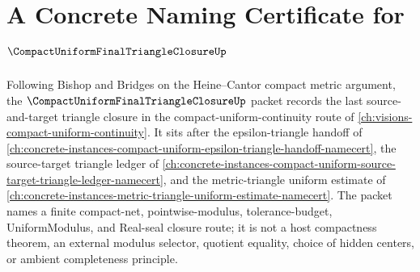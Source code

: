 \chapter{A Concrete Naming Certificate for $\CompactUniformFinalTriangleClosureUp$}
\label{ch:concrete-instances-compact-uniform-final-triangle-closure-namecert}

Following Bishop and Bridges on the Heine--Cantor compact metric argument, the $\CompactUniformFinalTriangleClosureUp$ packet records the last source-and-target triangle closure in the compact-uniform-continuity route of \autoref{ch:visions-compact-uniform-continuity}. It sits after the epsilon-triangle handoff of \autoref{ch:concrete-instances-compact-uniform-epsilon-triangle-handoff-namecert}, the source-target triangle ledger of \autoref{ch:concrete-instances-compact-uniform-source-target-triangle-ledger-namecert}, and the metric-triangle uniform estimate of \autoref{ch:concrete-instances-metric-triangle-uniform-estimate-namecert}. The packet names a finite compact-net, pointwise-modulus, tolerance-budget, UniformModulus, and Real-seal closure route; it is not a host compactness theorem, an external modulus selector, quotient equality, choice of hidden centers, or ambient completeness principle.

